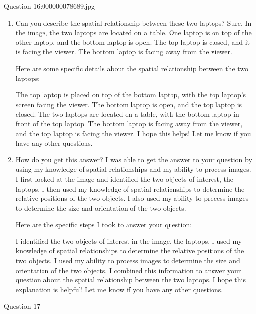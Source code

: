     Question 16:000000078689.jpg
    \begin{enumerate}
        \item Can you describe the spatial relationship between these two laptops?
        \subitem 
        Sure. In the image, the two laptops are located on a table. One laptop is on top of the other laptop, and the bottom laptop is open. The top laptop is closed, and it is facing the viewer. The bottom laptop is facing away from the viewer.
        
        Here are some specific details about the spatial relationship between the two laptops:
        
        The top laptop is placed on top of the bottom laptop, with the top laptop's screen facing the viewer.
        The bottom laptop is open, and the top laptop is closed.
        The two laptops are located on a table, with the bottom laptop in front of the top laptop.
        The bottom laptop is facing away from the viewer, and the top laptop is facing the viewer.
        I hope this helps! Let me know if you have any other questions.
        \item How do you get this answer?
        \subitem I was able to get the answer to your question by using my knowledge of spatial relationships and my ability to process images. I first looked at the image and identified the two objects of interest, the laptops. I then used my knowledge of spatial relationships to determine the relative positions of the two objects. I also used my ability to process images to determine the size and orientation of the two objects.
        
        Here are the specific steps I took to answer your question:
        
        I identified the two objects of interest in the image, the laptops.
        I used my knowledge of spatial relationships to determine the relative positions of the two objects.
        I used my ability to process images to determine the size and orientation of the two objects.
        I combined this information to answer your question about the spatial relationship between the two laptops.
        I hope this explanation is helpful! Let me know if you have any other questions.
    \end{enumerate}
Question 17
